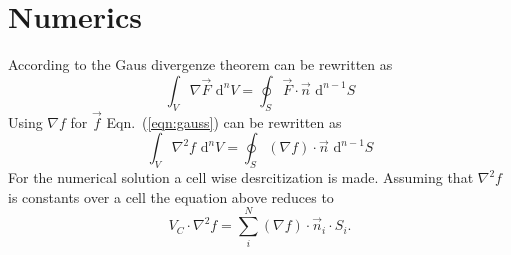 \chapter{Numerics}
According to \cite{erlebacher1985finite} the Gaus divergenze theorem can be rewritten as
\begin{equation}
  \label{eqn:gauss}
  \int_V \nabla \vec{F} \,\, \mathrm{d}^n V = \oint_S \vec{F} \cdot \vec{n} \,\, \mathrm{d}^{n-1}S
\end{equation}
Using $\nabla f$ for $\vec{f}$ Eqn.~(\ref{eqn:gauss}) can be rewritten as
\begin{equation}
  \int_V \nabla^2 f \,\, \mathrm{d}^n V = \oint_S (\nabla f) \cdot \vec{n} \,\, \mathrm{d}^{n-1}S
\end{equation}
For the numerical solution a cell wise desrcitization is made.
Assuming that $\nabla^2 f$ is constants over a cell the equation above reduces to
\begin{equation}
  V_C \cdot \nabla^2 f = \sum_i^N (\nabla f) \cdot \vec{n}_i \cdot S_{i}.
\end{equation}

